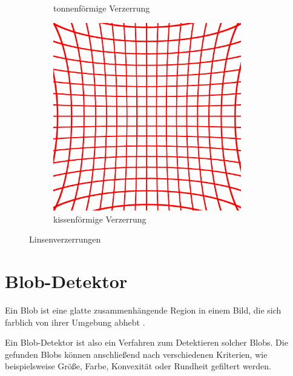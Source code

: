 \begin{figure}[!htb]
\begin{subfigure}{.33\textwidth}
		\caption{tonnenförmige Verzerrung}
		\label{fig:barrel}
	\end{subfigure}%
	\begin{subfigure}{.33\textwidth}
		\centering
		\includegraphics[width=0.9\textwidth]{images/cushionDistortion.png}
		\caption{kissenförmige Verzerrung}
		\label{fig:cushion}
	\end{subfigure}
	\caption{Linsenverzerrungen}
	\label{fig:distortion}
\end{figure}



\section{Blob-Detektor}
\label{s:blob}
\begin{definition}[Blob]\label{def:blob}
	Ein Blob ist eine glatte zusammenhängende Region in einem Bild, die sich farblich von ihrer Umgebung abhebt \cite{Lindeberg1993}.
\end{definition}

Ein Blob-Detektor ist also ein Verfahren zum Detektieren solcher Blobs. Die gefunden Blobs können anschließend nach verschiedenen Kriterien, wie beispielsweise Größe, Farbe, Konvexität oder Rundheit gefiltert werden. 


